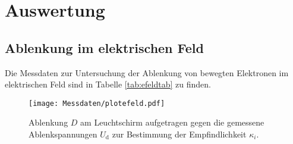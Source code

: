 \section{Auswertung}
\label{sec:Auswertung}

\subsection{Ablenkung im elektrischen Feld}
Die Messdaten zur Untersuchung der Ablenkung von bewegten Elektronen im elektrischen Feld sind
in Tabelle \ref{tab:efeldtab} zu finden.
\begin{figure}
  \centering
  \texttt{[image: Messdaten/plotefeld.pdf]}
  \caption{Ablenkung $D$ am Leuchtschirm aufgetragen gegen die gemessene Ablenkspannungen $U_\mathrm{d}$ zur Bestimmung der Empfindlichkeit $\kappa_i$.}
  \label{fig:efeld}
\end{figure}


